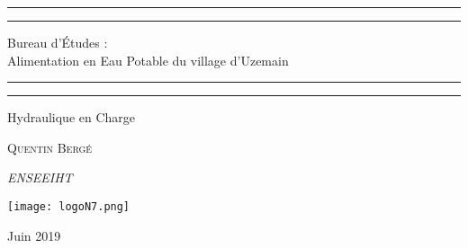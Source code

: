 \documentclass[a4paper,oneside]{article}
\begin{document}
\begin{titlepage} %

	\centering %

	\scshape %

	\vspace*{\baselineskip} %


	\rule{\textwidth}{1.6pt}\vspace*{-\baselineskip}\vspace*{2pt}
	\rule{\textwidth}{0.4pt} %

	\vspace{0.75\baselineskip} %

	{\LARGE Bureau d'\'Etudes :\\
	\vspace{0.75\baselineskip}
	Alimentation en Eau Potable du village d'Uzemain \\
	} %

	\vspace{1\baselineskip} %
	\rule{\textwidth}{0.4pt}\vspace*{-\baselineskip}\vspace*{3.2pt}
	\rule{\textwidth}{1.6pt} %
	\vspace{2\baselineskip} %


	Hydraulique en Charge

	\vspace*{3\baselineskip} %



	\vspace{0.5\baselineskip} %

	{\scshape\Large Quentin Bergé \\} %

	\vspace{0.5\baselineskip} %

	\textit{ENSEEIHT} %

	\vfill %


	\texttt{[image: logoN7.png]} %

	\vspace{0.3\baselineskip} %

Juin 2019 %
\end{titlepage}
\newpage

\tableofcontents
\newpage
\end{document}
